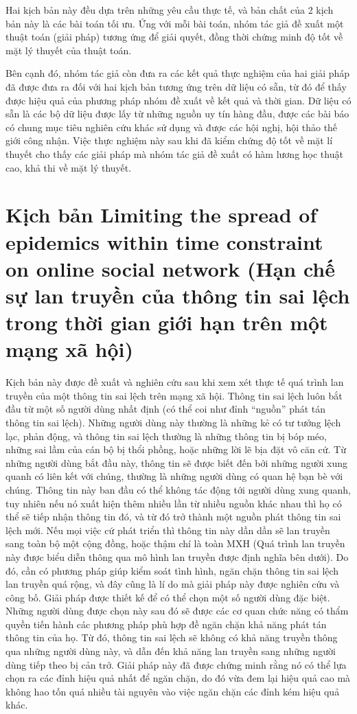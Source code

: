 Hai kịch bản này đều dựa trên những yêu cầu thực tế, và bản chất của 2 kịch bản này là các bài toán tối ưu. Ứng với mỗi bài toán, nhóm tác giả đề xuất một thuật toán (giải pháp) tương ứng để giải quyết, đồng thời chứng minh độ tốt về mặt lý thuyết của thuật toán.

Bên cạnh đó, nhóm tác giả còn đưa ra các kết quả thực nghiệm của hai giải pháp đã được đưa ra đối với hai kịch bản tương ứng trên dữ liệu có sẵn, từ đó để thấy được hiệu quả của phương pháp nhóm đề xuất về kết quả và thời gian. Dữ liệu có sẵn là các bộ dữ liệu được lấy từ những nguồn uy tín hàng đầu, được các bài báo có chung mục tiêu nghiên cứu khác sử dụng và được các hội nghị, hội thảo thế giới công nhận. Việc thực nghiệm này sau khi đã kiểm chứng độ tốt về mặt lí thuyết cho thấy các giải pháp mà nhóm tác giả đề xuất có hàm lương học thuật cao, khả thi về mặt lý thuyết.

\section{Kịch bản Limiting the spread of epidemics within time constraint on online social network (Hạn chế sự lan truyền của thông tin sai lệch trong thời gian giới hạn trên một mạng xã hội)}
Kịch bản này được đề xuất và nghiên cứu sau khi xem xét thực tế quá trình lan truyền của một thông tin sai lệch trên mạng xã hội. Thông tin sai lệch luôn bắt đầu từ một số người dùng nhất định (có thể coi như đỉnh “nguồn” phát tán thông tin sai lệch). Những người dùng này thường là những kẻ có tư tưởng lệch lạc, phản động, và thông tin sai lệch thường là những thông tin bị bóp méo, những sai lầm của cán bộ bị thổi phồng, hoặc những lời lẽ bịa đặt vô căn cứ. Từ những người dùng bắt đầu này, thông tin sẽ được biết đến bởi những người xung quanh có liên kết với chúng, thường là những người dùng có quan hệ bạn bè với chúng. Thông tin này ban đầu có thể không tác động tới người dùng xung quanh, tuy nhiên nếu nó xuất hiện thêm nhiều lần từ nhiều nguồn khác nhau thì họ có thể sẽ tiếp nhận thông tin đó, và từ đó trở thành một nguồn phát thông tin sai lệch mới. Nếu mọi việc cứ phát triển thì thông tin này dần dần sẽ lan truyền sang toàn bộ một cộng đồng, hoặc thậm chí là toàn MXH (Quá trình lan truyền này được biểu diễn thông qua mô hình lan truyền được định nghĩa bên dưới). Do đó, cần có phương pháp giúp kiểm soát tình hình, ngăn chặn thông tin sai lệch lan truyền quá rộng, và đây cũng là lí do mà giải pháp này được nghiên cứu và công bố. Giải pháp được thiết kế để có thể chọn một số người dùng đặc biệt. Những người dùng được chọn này sau đó sẽ được các cơ quan chức năng có thẩm quyền tiến hành các phương pháp phù hợp đề ngăn chặn khả năng phát tán thông tin của họ. Từ đó, thông tin sai lệch sẽ không có khả năng truyền thông qua những người dùng này, và dẫn đến khả năng lan truyền sang những người dùng tiếp theo bị cản trở. Giải pháp này đã được chứng minh rằng nó có thể lựa chọn ra các đỉnh hiệu quả nhất để ngăn chặn, do đó vừa đem lại hiệu quả cao mà không hao tốn quá nhiều tài nguyên vào việc ngăn chặn các đỉnh kém hiệu quả khác.
